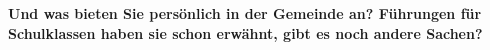 \begin{otherlanguage}{ngerman}



\textbf{Und was bieten Sie persönlich in der Gemeinde an? Führungen für Schulklassen haben sie schon erwähnt, gibt es noch andere Sachen?} 


\end{otherlanguage}
